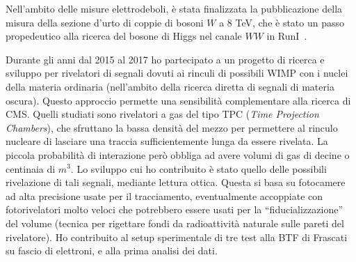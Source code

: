 \documentclass[a4paper,12pt,twoside]{article}
\begin{document}
{  Nell'ambito delle misure elettrodeboli, \`e stata finalizzata la
  pubblicazione della misura della sezione d'urto di coppie di bosoni
  $W$ a 8 TeV, che \`e stato un passo propedeutico alla ricerca del
  bosone di Higgs nel canale $WW$ in RunI~.
  
  Durante gli anni dal 2015 al 2017 ho partecipato a un progetto di
  ricerca e sviluppo per rivelatori di segnali dovuti ai rinculi di
  possibili WIMP con i nuclei della materia ordinaria (nell'ambito
  della ricerca diretta di segnali di materia oscura). Questo
  approccio permette una sensibilit\`a complementare alla ricerca di
  CMS. Quelli studiati sono rivelatori a gas del tipo TPC ({\it Time
    Projection Chambers}), che sfruttano la bassa densit\`a del mezzo
  per permettere al rinculo nucleare di lasciare una traccia
  sufficientemente lunga da essere rivelata. La piccola probabilit\`a
  di interazione per\`o obbliga ad avere volumi di gas di decine o
  centinaia di $m^3$. Lo sviluppo cui ho contribuito \`e stato quello
  delle possibili rivelazione di tali segnali, mediante lettura
  ottica.  Questa si basa su fotocamere ad alta precisione usate per
  il tracciamento, eventualmente accoppiate con fotorivelatori molto
  veloci che potrebbero essere usati per la ``fiducializzazione'' del
  volume (tecnica per rigettare fondi da radioattivit\`a naturale
  sulle pareti del rivelatore). Ho contribuito al setup sperimentale
  di tre test alla BTF di Frascati su fascio di elettroni, e alla
  prima analisi dei dati.
  

}


\citeall{*}
\end{document}

